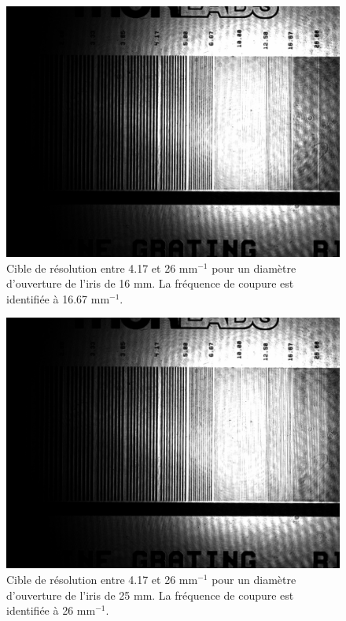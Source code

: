 \documentclass[11pt,letterpaper]{article}
\begin{document}
\begin{figure}[H]
  \centering
  \includegraphics[scale=0.28]{cible_d16_8-14.png}
  \caption{Cible de résolution entre 4.17 et 26 mm$^{-1}$ pour un diamètre d'ouverture de l'iris de 16 mm. La fréquence de coupure est identifiée à 16.67 mm$^{-1}$.}
  \label{cible16}
\end{figure}

\begin{figure}[H]
  \centering
  \includegraphics[scale=0.28]{cible_d25_8-14.png}
  \caption{Cible de résolution entre 4.17 et 26 mm$^{-1}$ pour un diamètre d'ouverture de l'iris de 25 mm. La fréquence de coupure est identifiée à 26 mm$^{-1}$.}
  \label{cible25}
\end{figure}
\end{document}

